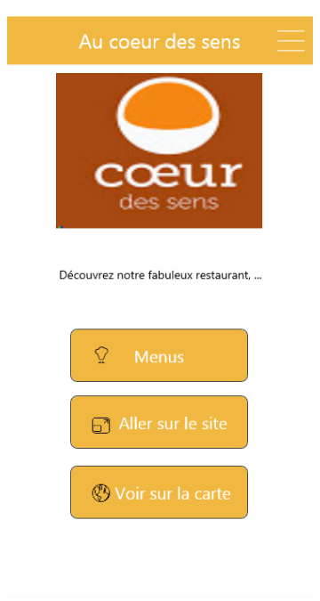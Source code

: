 \documentclass{eplmastersthesis}
\begin{document}
\begin{figure}[H]
    \centering
\begin{subfigure}[b]{0.3\textwidth}
        \includegraphics[width=\textwidth]{Images/InVision/detail-resto.png}
    \end{subfigure}
    ~ %

\end{figure}
\end{document}
